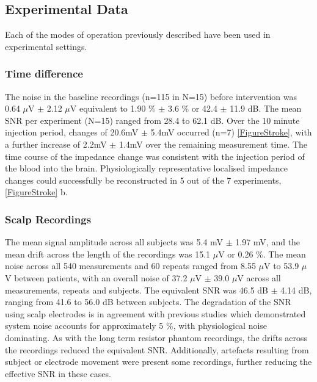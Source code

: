 \subsection{Experimental Data}

Each of the modes of operation previously described have been used in experimental settings. 

\subsubsection{Time difference}
The noise in the baseline recordings (n=115 in N=15) before intervention was 0.64 $\mu$V $\pm$ 2.12 $\mu$V equivalent to 1.90 \% $\pm$ 3.6 \% or 42.4 $\pm$ 11.9 dB. The mean SNR per experiment (N=15) ranged from 28.4 to 62.1 dB. Over the 10 minute injection period, changes of 20.6mV \(\pm\) 5.4mV occurred (n=7) \ref{FigureStroke}, with a further increase of 2.2mV \(\pm\) 1.4mV over the remaining measurement time. The time course of the impedance change was consistent with the injection period of the blood into the brain. Physiologically representative localised impedance changes could successfully be reconstructed in 5 out of the 7 experiments, \ref{FigureStroke} b. 


\subsubsection{Scalp Recordings}
The mean signal amplitude across all subjects was 5.4 mV $\pm$ 1.97 mV, and the mean drift across the length of the recordings was 15.1 $\mu$V or 0.26 \%. The mean noise across all 540 measurements and 60 repeats ranged from 8.55 $\mu$V to 53.9 $\mu$V between patients, with an overall noise of 37.2  $\mu$V $\pm$ 39.0 $\mu$V across all measurements, repeats and subjects. The equivalent SNR was 46.5 dB $\pm$ 4.14 dB, ranging from 41.6 to 56.0 dB between subjects. The degradation of the SNR using scalp electrodes is in agreement with previous studies \cite{fabrizi2007analysis} which demonstrated system noise accounts for approximately 5 \%, with physiological noise dominating. As with the long term resistor phantom recordings, the drifts across the recordings reduced the equivalent SNR. Additionally, artefacts resulting from subject or electrode movement were present some recordings, further reducing the effective SNR in these cases.  


